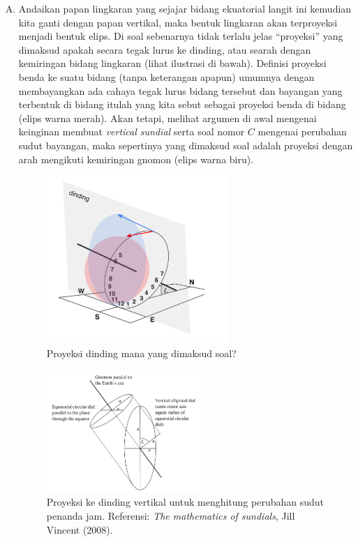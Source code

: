 \documentclass[11pt,fleqn]{exam}
\begin{document}
\begin{questions}
\begin{enumerate}[A.]
\item Andaikan papan lingkaran yang sejajar bidang ekuatorial langit ini kemudian kita ganti dengan papan vertikal, maka bentuk lingkaran akan terproyeksi menjadi bentuk elips. Di soal sebenarnya tidak terlalu jelas ``proyeksi'' yang dimaksud apakah secara tegak lurus ke dinding, atau searah dengan kemiringan bidang lingkaran (lihat ilustrasi di bawah). Definisi proyeksi benda ke suatu bidang (tanpa keterangan apapun) umumnya dengan membayangkan ada cahaya tegak lurus bidang tersebut dan bayangan yang terbentuk di bidang itulah yang kita sebut sebagai proyeksi benda di bidang (elips warna merah). Akan tetapi, melihat argumen di awal mengenai keinginan membuat \textit{vertical sundial} serta soal nomor $C$ mengenai perubahan sudut bayangan, maka sepertinya yang dimaksud soal adalah proyeksi dengan arah mengikuti kemiringan gnomon (elips warna biru).
\begin{figure}[H]
\centering
\includegraphics[width=0.65\textwidth]{osp2022_27_jawab1.png}
\captionsetup{labelformat=empty}
\caption{Proyeksi dinding mana yang dimaksud soal?}
\label{fig:osp2022_27_proj}
\end{figure}

\begin{figure}[H]
\centering
\includegraphics[width=0.55\textwidth]{sundialmath.png}
\captionsetup{labelformat=empty}
\caption{Proyeksi ke dinding vertikal untuk menghitung perubahan sudut penanda jam. Referensi: \textit{The mathematics of sundials}, Jill Vincent (2008).}
\label{fig:sundialmath}
\end{figure}


\end{enumerate}
\end{questions}
\end{document}
